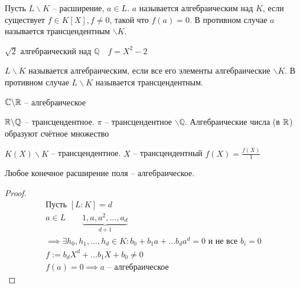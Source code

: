 \documentclass[main]{subfiles}
\begin{document}
\begin{definition}
    Пусть $L \backslash K$ -- расширение, $a \in L$. $a$ называется алгебраическим
    над $K$, если существует $f \in K[X], f \ne 0$, такой что $f(a) = 0 $. В противном случае $a$
    называется трансцендентным $\backslash K$.
\end{definition}

\begin{example}
    $\sqrt{2}$ алгебраический над $\mathbb{Q} \quad f = X^2-2$
\end{example}
$L \backslash K$ называется алгебраическим, если все его элементы алгебраические $\backslash K$.
В противном случае $L \backslash K$ называется трансцендентным.
\begin{example}
    $\mathbb{C} \backslash \mathbb{R} $ -- алгебраическое 
\end{example}
\begin{example}
    $\mathbb{R} \backslash \mathbb{Q}$ -- трансцендентное. $\pi$ -- трансцендентное $\backslash \mathbb{Q}$.
    Алгебраические числа (в $\mathbb{R}$) образуют счётное множество
\end{example}
\begin{example}
    $K(X) \backslash K$ -- трансцендентное.  $X$ -- трансцендентный $f(X) = \frac{f(X)}{1}$
\end{example}

\begin{proposition}
    Любое конечное расширение поля -- алгебраическое.
\end{proposition}
\begin{proof}
    \begin{gather*}
        \text{Пусть } [L:K] = d \\
        a \in L \quad \quad \underbrace{1, a, a^2, \ldots, a_d}_{d+1} \\
        \implies \exists h_0, h_1, \ldots, h_d \in K : b_0 + b_1a + \ldots b_da^d = 0 \text{ и не все } b_i = 0\\
        f:= b_dX^d + \ldots b_1 X + b_0 \ne 0 \\
        f(a) = 0 \implies a \text{ -- алгебраическое }
    \end{gather*}
\end{proof}
\end{document}
